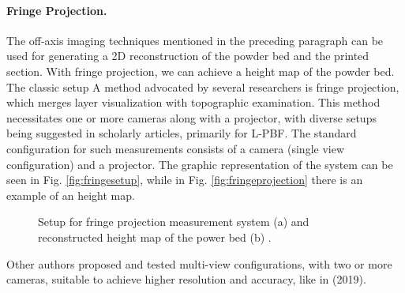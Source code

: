 \paragraph{Fringe Projection.} The off-axis imaging techniques mentioned in the preceding paragraph can be used for generating a 2D reconstruction of the powder bed and the printed section. With fringe projection, we can achieve a height map of the powder bed. The classic setup A method advocated by several researchers is fringe projection, which merges layer visualization with topographic examination. This method necessitates one or more cameras along with a projector, with diverse setups being suggested in scholarly articles, primarily for L-PBF. The standard configuration for such measurements consists of a camera (single view configuration) and a projector. The graphic representation of the system can be seen in Fig. \ref{fig:fringesetup}, while in Fig. \ref{fig:fringeprojection} there is an example of an height map.
\begin{figure}
    \centering
    \qquad
    \caption[Fringe projection.]{Setup for fringe projection measurement system (a) and reconstructed height map of the power bed (b) \cite{zhang_situ_2016}.}
\end{figure}
Other authors proposed and tested multi-view configurations, with two or more cameras, suitable to achieve higher resolution and accuracy, like in \citeauthor{kalms_new_2019} (2019).
